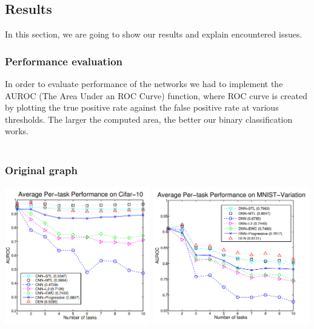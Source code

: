 \documentclass[12pt]{article}
\begin{document}
    \subsection {Results}

    In this section, we are going to show our results and explain encountered issues.

    \subsubsection{Performance evaluation}

    In order to evaluate performance of the networks we had to implement the AUROC (The Area Under an ROC
    Curve) function, where ROC curve is created by plotting the true positive rate against the false
    positive rate at various thresholds. The larger the computed area, the better our binary classification works. 
    \\
    \\
    \subsubsection{Original graph}
    \includegraphics[height=6cm]{paper-cifar-10.png}
    \includegraphics[height=6cm]{paper-mnist-var.png}
\end{document}
